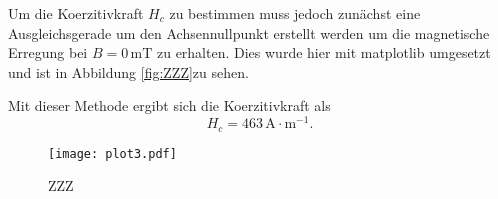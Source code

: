 Um die Koerzitivkraft $H_c$ zu bestimmen muss jedoch
zunächst eine Ausgleichsgerade um den Achsennullpunkt
erstellt werden um die magnetische Erregung bei
$B=0\,\si{\milli\tesla}$ zu erhalten. Dies wurde hier
mit matplotlib \cite{matplotlib} umgesetzt und ist in Abbildung \ref{fig:ZZZ}zu sehen. 

Mit dieser Methode ergibt sich die Koerzitivkraft als
\begin{equation}
  H_c=463\,\si{\ampere\cdot\meter^{-1}}\nonumber.
\end{equation}

\begin{figure}
  \texttt{[image: plot3.pdf]}
  \caption{ZZZ}
\end{figure}


